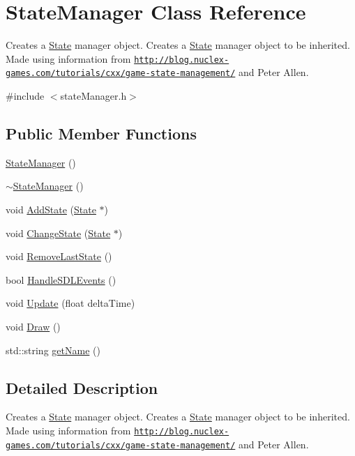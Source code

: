 \hypertarget{class_state_manager}{\section{State\+Manager Class Reference}
\label{class_state_manager}
}


Creates a \hyperlink{class_state}{State} manager object. Creates a \hyperlink{class_state}{State} manager object to be inherited. Made using information from \href{http://blog.nuclex-games.com/tutorials/cxx/game-state-management/}{\tt http\+://blog.\+nuclex-\/games.\+com/tutorials/cxx/game-\/state-\/management/} and Peter Allen.  




{\ttfamily \#include $<$state\+Manager.\+h$>$}

\subsection*{Public Member Functions}
\begin{DoxyCompactItemize}
\item 
\hyperlink{class_state_manager_a3e2be96d935eb56813b096a885d58587}{State\+Manager} ()
\item 
\hyperlink{class_state_manager_a05a43504a033f1befad5c5118249ec6f}{$\sim$\+State\+Manager} ()
\item 
void \hyperlink{class_state_manager_aa925e9a15bba3cc4b262a08c8024ea3b}{Add\+State} (\hyperlink{class_state}{State} $\ast$)
\item 
void \hyperlink{class_state_manager_a8c14290973150a37afdf365d00ffcbba}{Change\+State} (\hyperlink{class_state}{State} $\ast$)
\item 
void \hyperlink{class_state_manager_ac782f24f5c02c27169bc2b3bf7aa3d41}{Remove\+Last\+State} ()
\item 
bool \hyperlink{class_state_manager_a10042662c52179ea1ad85051562ca4bf}{Handle\+S\+D\+L\+Events} ()
\item 
void \hyperlink{class_state_manager_a0b430dbaff295c0f96d365da8113fd31}{Update} (float delta\+Time)
\item 
void \hyperlink{class_state_manager_a2827f9e10336c53c7957ed5c09cb2a49}{Draw} ()
\item 
std\+::string \hyperlink{class_state_manager_afc67a8f9404b7c92237a654630eb7516}{get\+Name} ()
\end{DoxyCompactItemize}


\subsection{Detailed Description}
Creates a \hyperlink{class_state}{State} manager object. Creates a \hyperlink{class_state}{State} manager object to be inherited. Made using information from \href{http://blog.nuclex-games.com/tutorials/cxx/game-state-management/}{\tt http\+://blog.\+nuclex-\/games.\+com/tutorials/cxx/game-\/state-\/management/} and Peter Allen. 

